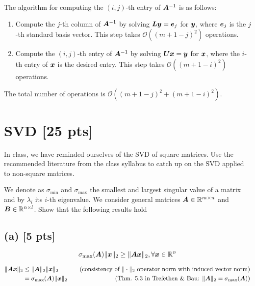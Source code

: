 \documentclass[twoside,10pt]{article}
\begin{document}
\quad The algorithm for computing the $(i, j)$-th entry of $\bm{A}^{-1}$ is as follows:

\begin{enumerate}
\item Compute the $j$-th column of $\bm{A}^{-1}$ by solving $\bm{L} \bm{y} = \bm{e}_j$ for $\bm{y}$, where $\bm{e}_j$ is the $j$-th standard basis vector.
This step takes $\mathcal{O}(\left(m + 1 - j\right)^2)$ operations.
\item Compute the $(i, j)$-th entry of $\bm{A}^{-1}$ by solving $\bm{U} \bm{x} = \bm{y}$ for $\bm{x}$, where the $i$-th entry of $\bm{x}$ is the desired entry.
This step takes $\mathcal{O}(\left(m + 1 - i\right)^2)$ operations.
\end{enumerate}

\quad The total number of operations is $\mathcal{O}(\left(m + 1 - j\right)^2 + \left(m + 1 - i\right)^2)$.

\section{SVD [25 pts]}
In class, we have reminded ourselves of the SVD of square matrices. 
Use the recommended literature from the class syllabus to catch up on the SVD applied to non-square matrices. 

We denote as $\sigma_{\mathrm{min}}$ and $\sigma_{\mathrm{max}}$ the smallest and largest singular value of a matrix and by $\lambda_{i}$ its $i$-th eigenvalue. 
We consider general matrices $\bm{A} \in \mathbb{R}^{m \times n}$ and $\bm{B} \in \mathbb{R}^{n \times l}$.
Show that the following results hold 

\subsection*{(a) [5 pts]}
  \begin{equation*}
    \sigma_{\mathrm{max}}(\bm{A}) \|\bm{x}\|_2 \geq \|\bm{A} \bm{x}\|_2, \forall \bm{x} \in \mathbb{R}^n
  \end{equation*}

\begin{align*}
 \|\bm{A} \bm{x}\|_2 &\leq \|\bm{A}\|_2\|\bm{x}\|_2 &\quad\text{(consistency of $\|\cdot\|_2$ operator norm with induced vector norm)}\\
 &= \sigma_{\mathrm{max}}(\bm{A})\|\bm{x}\|_2 &\quad\text{(Thm. 5.3 in Trefethen \& Bau: $\|\bm{A}\|_2 = \sigma_{\mathrm{max}}(\bm{A})$)}
\end{align*}
\end{document}
